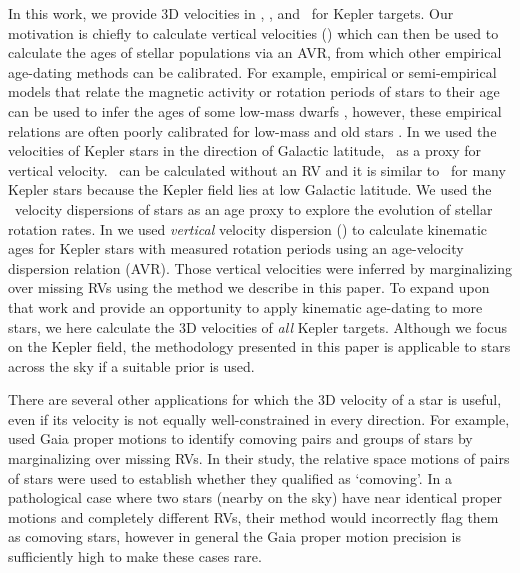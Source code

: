 In this work, we provide 3D velocities in \vx, \vy, and \vz\ for Kepler
targets.
Our motivation is chiefly to calculate vertical velocities (\vz) which can
then be used to calculate the ages of stellar populations via an AVR, from
which other empirical age-dating methods can be calibrated.
For example, empirical or semi-empirical models that relate the magnetic
activity or rotation periods of stars to their age can be used to infer the
ages of some low-mass dwarfs \citep[\eg][]{skumanich1972, barnes2003,
barnes2007, mamajek2008, matt2012, angus2019, claytor2020}, however, these
empirical relations are often poorly calibrated for low-mass and old stars
\citep[\eg][]{angus2015, vansaders2016, vansaders2018, metcalfe2019,
curtis2020, spada2019, angus2020}.
In \citet{angus2020} we used the velocities of Kepler stars in the direction
of Galactic latitude, \vb\, as a proxy for vertical velocity.
\vb\ can be calculated without an RV and it is similar to \vz\ for many Kepler
stars because the Kepler field lies at low Galactic latitude.
We used the \vb\ velocity dispersions of stars as an age proxy to explore the
evolution of stellar rotation rates.
In \citet{lu2021} we used {\it vertical} velocity dispersion (\vz) to
calculate kinematic ages for Kepler stars with measured rotation periods using
an age-velocity dispersion relation (AVR).
Those vertical velocities were inferred by marginalizing over missing RVs
using the method we describe in this paper.
To expand upon that work and provide an opportunity to apply kinematic
age-dating to more stars, we here calculate the 3D velocities of {\it all}
Kepler targets.
Although we focus on the Kepler field, the methodology presented in this paper
is applicable to stars across the sky if a suitable prior is used.

There are several other applications for which the 3D velocity of a star is
useful, even if its velocity is not equally well-constrained in every
direction.
For example, \citet{oh2017} used Gaia proper motions to identify comoving
pairs and groups of stars by marginalizing over missing RVs.
In their study, the relative space motions of pairs of stars were used to
establish whether they qualified as `comoving'.
In a pathological case where two stars (nearby on the sky) have near identical
proper motions and completely different RVs, their method would incorrectly
flag them as comoving stars, however in general the Gaia proper motion
precision is sufficiently high to make these cases rare.

